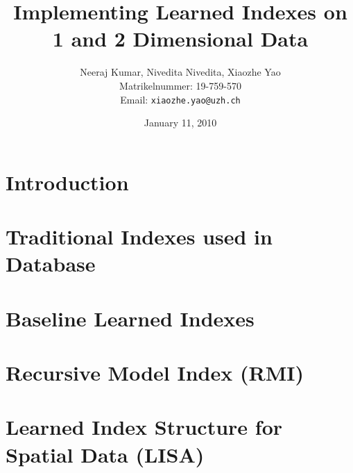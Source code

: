 \documentclass[a4paper,12pt]{scrreprt}
\title{Implementing Learned Indexes on 1 and 2 Dimensional Data}
\author{
  Neeraj Kumar, Nivedita Nivedita, Xiaozhe Yao\\[-5pt]
  \scriptsize Matrikelnummer: 19-759-570\\[-5pt]
  \scriptsize Email: \texttt{xiaozhe.yao@uzh.ch}
}
\date{\vspace*{2cm}January 11, 2010}
\begin{document}
\begingroup
\let\newpage\relax%
\maketitle
\newpage\null\thispagestyle{blank}\newpage
\setcounter{page}{0}
\endgroup

\begin{abstract}

\end{abstract}

\chapter{Introduction}



\chapter{Traditional Indexes used in Database}



\chapter{Baseline Learned Indexes}



\chapter{Recursive Model Index (RMI)}



\chapter{Learned Index Structure for Spatial Data (LISA)}






\end{document}
